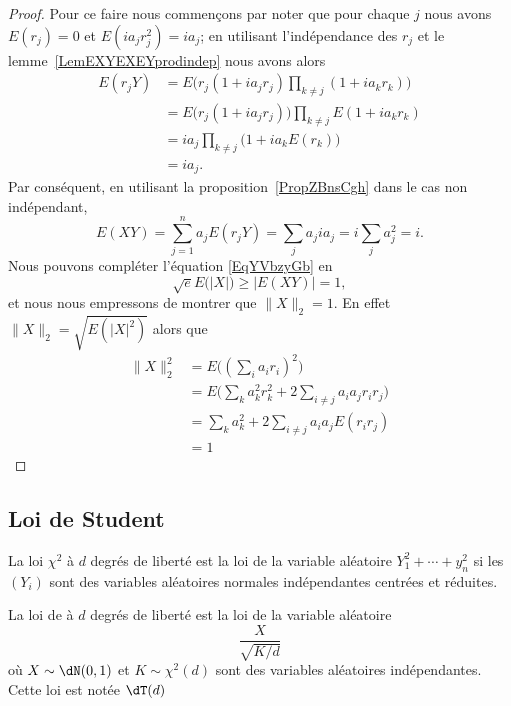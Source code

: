 \begin{proof}
	Pour ce faire nous commençons par noter que pour chaque \( j\) nous avons \( E(r_j)=0\) et \( E(ia_jr_j^2)=ia_j\); en utilisant l'indépendance des \( r_j\) et le lemme~\ref{LemEXYEXEYprodindep} nous avons alors
	\begin{subequations}
		\begin{align}
			E(r_jY) & =E\Big( r_j(1+ia_jr_j)\prod_{k\neq j}(1+ia_kr_k) \Big)  \\
			        & =E\big( r_j(1+ia_jr_j) \big)\prod_{k\neq j}E(1+ia_kr_k) \\
			        & =ia_j\prod_{k\neq j}\big( 1+ia_kE(r_k) \big)            \\
			        & =ia_j.
		\end{align}
	\end{subequations}
	Par conséquent, en utilisant la proposition~\ref{PropZBnsCgh} dans le cas non indépendant,
	\begin{equation}
		E(XY)=\sum_{j=1}^na_jE(r_jY)=\sum_ja_jia_j=i\sum_ja_j^2=i.
	\end{equation}
	Nous pouvons compléter l'équation \eqref{EqYVbzyGb} en
	\begin{equation}
		\sqrt{e}E\big( | X | \big)\geq \big| E(XY) \big|=1,
	\end{equation}
	et nous nous empressons de montrer que \( \| X \|_2=1\). En effet \( \| X \|_2=\sqrt{E(| X |^2)}\) alors que
	\begin{subequations}
		\begin{align}
			\| X \|_2^2 & =E\big( (\sum_ia_ir_i)^2 \big)                             \\
			            & =E\Big( \sum_ka_k^2r_k^2+2\sum_{i\neq j}a_ia_jr_ir_j \Big) \\
			            & =\sum_ka_k^2+2\sum_{i\neq j}a_ia_jE(r_ir_j)                \\
			            & =1
		\end{align}
	\end{subequations}
\end{proof}

\subsection{Loi de Student}

\begin{definition}
	La loi \( \chi^2\) à \( d\) degrés de liberté est la loi de la variable aléatoire \( Y_1^2+\cdots+y_n^2\) si les \( (Y_i)\) sont des variables aléatoires normales indépendantes centrées et réduites.

	La loi de  à \( d\) degrés de liberté est la loi de la variable aléatoire
	\begin{equation}
		\frac{ X }{ \sqrt{K/d} }
	\end{equation}
	où \( X\sim\dN(0,1)\) et \( K\sim\chi^2(d)\) sont des variables aléatoires indépendantes. Cette loi est notée \( \dT(d)\)
\end{definition}

